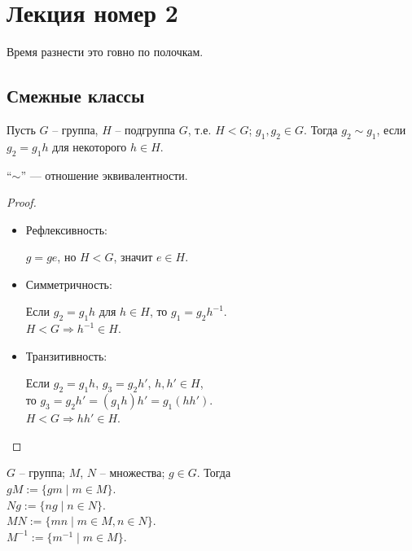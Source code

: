 \section{Лекция номер 2}

Время разнести это говно по полочкам.

\subsection{Смежные классы}

\begin{conj}
    Пусть $G$ -- группа, $H$ -- подгруппа $G$, т.е. $H < G$;
    $g_1, g_2 \in G$. Тогда $g_2 \sim g_1$, если $g_2 = g_1 h$ для
    некоторого $h \in H$.
\end{conj}

\begin{theorem-non}
    ``$\sim$'' --- отношение эквивалентности.
\end{theorem-non}
\begin{proof} $ $

    \begin{itemize}
        \item Рефлексивность:
        
        $g = ge$, но $H < G$, значит $e \in H$.

        \item Симметричность:
        
        Если $g_2 = g_1 h$ для $h \in H$, то $g_1 = g_2 h^{-1}$. \\
        $H < G \Rightarrow h^{-1} \in H$.

        \item Транзитивность:
        
        Если $g_2 = g_1 h$, $g_3 = g_2 h'$, $h, h' \in H$, \\
        то $g_3 = g_2 h' = (g_1 h) h' = g_1 (hh')$. \\
        $H < G \Rightarrow hh' \in H$.

    \end{itemize}
\end{proof}

\begin{conj} $ $\\
    $G$ -- группа; $M$, $N$ -- множества; $g \in G$. Тогда \\
    $gM := \{ gm \mid m \in M \}$. \\
    $Ng := \{ ng \mid n \in N \}$. \\
    $MN := \{ mn \mid m \in M, n \in N \}$. \\
    $M^{-1} := \{ m^{-1} \mid m \in M \}$.
\end{conj}

